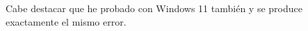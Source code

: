 \documentclass{article}
\begin{document}
Cabe destacar que he probado con Windows 11 también y se produce exactamente el mismo error.

%
%
%
%
%
%
%
%
\end{document}
